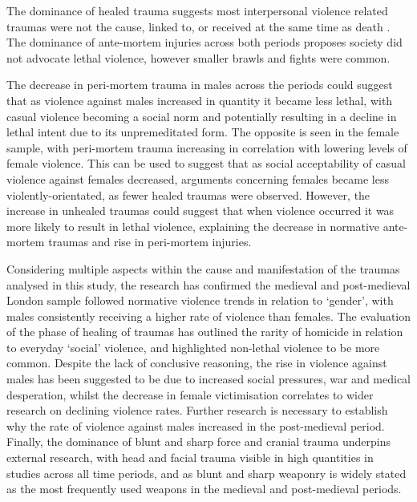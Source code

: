 
The dominance of healed trauma suggests most interpersonal violence related traumas were not the cause, linked to, or received at the same time as death \parencites{lovell1997}{roberts2003}. The dominance of ante-mortem injuries across both periods proposes society did not advocate lethal violence, however smaller brawls and fights were common.

The decrease in peri-mortem trauma in males across the periods could suggest that as violence against males increased in quantity it became less lethal, with casual violence becoming a social norm and potentially resulting in a decline in lethal intent due to its unpremeditated form. The opposite is seen in the female sample, with peri-mortem trauma increasing in correlation with lowering levels of female violence.  This can be used to suggest that as social acceptability of casual violence against females decreased, arguments concerning females became less violently-orientated, as fewer healed traumas were observed. However, the increase in unhealed traumas could suggest that when violence occurred it was more likely to result in lethal violence, explaining the decrease in normative ante-mortem traumas and rise in peri-mortem injuries.


Considering multiple aspects within the cause and manifestation of the traumas analysed in this study, the research has confirmed the medieval and post-medieval London sample followed normative violence trends in relation to ‘gender’, with males consistently receiving a higher rate of violence than females. The evaluation of the phase of healing of traumas has outlined the rarity of homicide in relation to everyday ‘social’ violence, and highlighted non-lethal violence to be more common. Despite the lack of conclusive reasoning, the rise in violence against males has been suggested to be due to increased social pressures, war and medical desperation, whilst the decrease in female victimisation correlates to wider research on declining violence rates. Further research is necessary to establish why the rate of violence against males increased in the post-medieval period. Finally, the dominance of blunt and sharp force and cranial trauma underpins external research, with head and facial trauma visible in high quantities in studies across all time periods, and as blunt and sharp weaponry is widely stated as the most frequently used weapons in the medieval and post-medieval periods.  


\IJSRAclosing%